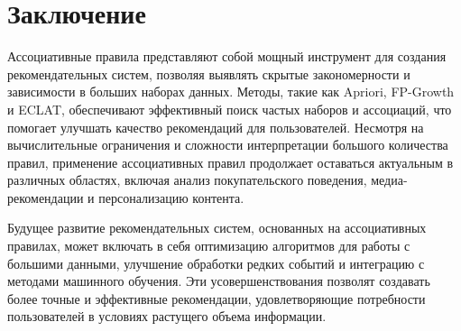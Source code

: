 \section{Заключение}
Ассоциативные правила представляют собой мощный инструмент для создания рекомендательных систем, позволяя выявлять скрытые закономерности и зависимости в больших наборах данных. Методы, такие как Apriori, FP-Growth и ECLAT, обеспечивают эффективный поиск частых наборов и ассоциаций, что помогает улучшать качество рекомендаций для пользователей. Несмотря на вычислительные ограничения и сложности интерпретации большого количества правил, применение ассоциативных правил продолжает оставаться актуальным в различных областях, включая анализ покупательского поведения, медиа-рекомендации и персонализацию контента.

Будущее развитие рекомендательных систем, основанных на ассоциативных правилах, может включать в себя оптимизацию алгоритмов для работы с большими данными, улучшение обработки редких событий и интеграцию с методами машинного обучения. Эти усовершенствования позволят создавать более точные и эффективные рекомендации, удовлетворяющие потребности пользователей в условиях растущего объема информации.



